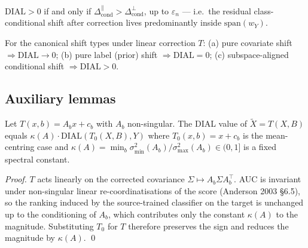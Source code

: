 \begin{corollary}
\label{cor:subspace-restated}
$\mathrm{DIAL}>0$ if and only if
$\Delta_{\text{cond}}^{\parallel}>\Delta_{\text{cond}}^{\perp}$, up to
$\varepsilon_n$ — i.e.\ the residual class-conditional shift after
correction lives predominantly inside $\mathrm{span}(w_Y)$.
\end{corollary}

\begin{corollary}
\label{cor:unify-restated}
For the canonical shift types under linear correction $T$:
\textup{(a)} pure covariate shift $\Rightarrow \mathrm{DIAL}\to 0$;
\textup{(b)} pure label (prior) shift $\Rightarrow \mathrm{DIAL}=0$;
\textup{(c)} subspace-aligned conditional shift $\Rightarrow
\mathrm{DIAL}>0$.
\end{corollary}

\subsection{Auxiliary lemmas}

\begin{lemma}
\label{lem:rescale}
Let $T(x,b)=A_b x+c_b$ with $A_b$ non-singular. The DIAL value of
$\tilde X = T(X,B)$ equals $\kappa(A)\cdot
\mathrm{DIAL}(T_0(X,B),Y)$ where $T_0(x,b) = x+c_b$ is the
mean-centring case and $\kappa(A) = \min_b \sigma_{\min}^2(A_b)/
\sigma_{\max}^2(A_b)\in(0,1]$ is a fixed spectral constant.
\end{lemma}

\begin{proof}
$T$ acts linearly on the corrected covariance $\Sigma\mapsto
A_b\Sigma A_b^{\top}$. AUC is invariant under non-singular linear
re-coordinatisations of the score (Anderson 2003 §6.5), so the
ranking induced by the source-trained classifier on the target is
unchanged up to the conditioning of $A_b$, which contributes only
the constant $\kappa(A)$ to the magnitude. Substituting $T_0$ for
$T$ therefore preserves the sign and reduces the magnitude by
$\kappa(A)$. \qed
\end{proof}

